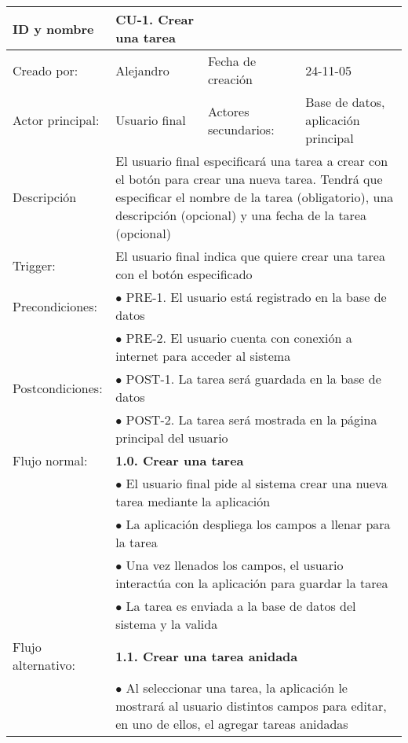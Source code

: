 \begin{center}
\begin{tabular}{p{3cm}p{5cm}p{4cm}p{2cm}}
  \hline
  ID y nombre & CU-1. Crear una tarea & & \\
  \hline
  Creado por: & Alejandro & Fecha de creaci\'on & 24-11-05\\
  \hline
  Actor principal: & Usuario final & Actores secundarios: & Base de datos, aplicaci\'on principal\\
  \hline
  Descripci\'on & \multicolumn{3}{p{11cm}}{El usuario final especificar\'a una tarea a crear con el bot\'on para crear una nueva tarea. Tendr\'a que especificar el nombre de la tarea (obligatorio), una descripci\'on (opcional) y una fecha de la tarea (opcional)}\\
  \hline
  Trigger: & \multicolumn{3}{p{11cm}}{El usuario final indica que quiere crear una tarea con el bot\'on especificado}\\
  \hline
  Precondiciones: & \multicolumn{3}{p{11cm}}{$\bullet$ PRE-1. El usuario est\'a registrado en la base de datos}\\
		  & \multicolumn{3}{p{11cm}}{$\bullet$ PRE-2. El usuario cuenta con conexi\'on a internet para acceder al sistema}\\
  \hline
  Postcondiciones: & \multicolumn{3}{p{11cm}}{$\bullet$ POST-1. La tarea ser\'a guardada en la base de datos}\\
		   & \multicolumn{3}{p{11cm}}{$\bullet$ POST-2. La tarea ser\'a mostrada en la p\'agina principal del usuario}\\
  \hline
  Flujo normal: & \multicolumn{3}{p{11cm}}{\textbf{1.0. Crear una tarea}}\\
		& \multicolumn{3}{p{11cm}}{$\bullet$ El usuario final pide al sistema crear una nueva tarea mediante la aplicaci\'on}\\
		& \multicolumn{3}{p{11cm}}{$\bullet$ La aplicaci\'on despliega los campos a llenar para la tarea}\\
		& \multicolumn{3}{p{11cm}}{$\bullet$ Una vez llenados los campos, el usuario interact\'ua con la aplicaci\'on para guardar la tarea}\\
		& \multicolumn{3}{p{11cm}}{$\bullet$ La tarea es enviada a la base de datos del sistema y la valida}\\
  \hline
  Flujo alternativo: & \multicolumn{3}{p{11cm}}{\textbf{1.1. Crear una tarea anidada}}\\
		     & \multicolumn{3}{p{11cm}}{$\bullet$ Al seleccionar una tarea, la aplicaci\'on le mostrar\'a al usuario distintos campos para editar, en uno de ellos, el agregar tareas anidadas}\\

\end{tabular}
\end{center}
